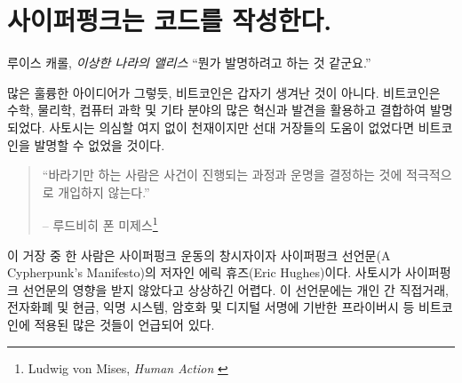 \chapter{사이퍼펑크는 코드를 작성한다.}
\label{les:20}

\begin{chapquote}
	{루이스 캐롤, \textit{이상한 나라의 앨리스}}
	\enquote{뭔가 발명하려고 하는 것 같군요.}
\end{chapquote}

\begin{comment}
	Like many great ideas, Bitcoin didn't come out of nowhere. It was made
	possible by utilizing and combining many innovations and discoveries in
	mathematics, physics, computer science, and other fields. While
	undoubtedly a genius, Satoshi wouldn't have been able to invent Bitcoin
	without the giants on whose shoulders he was standing on.
\end{comment}
많은 훌륭한 아이디어가 그렇듯, 비트코인은 갑자기 생겨난 것이 아니다.
비트코인은 수학, 물리학, 컴퓨터 과학 및 기타 분야의 많은 혁신과 발견을 활용하고 결합하여 발명되었다.
사토시는 의심할 여지 없이 천재이지만 선대 거장들의 도움이 없었다면 비트코인을 발명할 수 없었을 것이다.

\begin{quotation}\begin{samepage}
		\enquote{바라기만 하는 사람은 사건이 진행되는 과정과 운명을 결정하는 것에 적극적으로 개입하지 않는다.}
		\begin{flushright} -- 루드비히 폰 미제스\footnote{Ludwig von Mises, \textit{Human Action} \cite{human-action}}
\end{flushright}\end{samepage}\end{quotation}

\begin{comment}
	One of these giants is Eric Hughes, one of the founders of the cypherpunk
	movement and author of \textit{A Cypherpunk's Manifesto}. It's hard to imagine
	that Satoshi wasn't influenced by this manifesto. It speaks of many things which
	Bitcoin enables and utilizes, such as direct and private transactions,
	electronic money and cash, anonymous systems, and defending privacy with
	cryptography and digital signatures.
\end{comment}
이 거장 중 한 사람은 사이퍼펑크 운동의 창시자이자 사이퍼펑크 선언문(A Cypherpunk's Manifesto)의 저자인 
에릭 휴즈(Eric Hughes)이다.
사토시가 사이퍼펑크 선언문의 영향을 받지 않았다고 상상하긴 어렵다.
이 선언문에는 개인 간 직접거래, 전자화폐 및 현금, 익명 시스템, 암호화 및 디지털 서명에 기반한 프라이버시 등 
비트코인에 적용된 많은 것들이 언급되어 있다.

